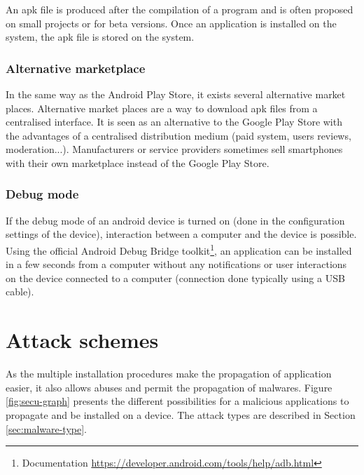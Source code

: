An apk file is produced after the compilation of a program and is often proposed on small projects or for beta versions.
Once an application is installed on the system, the apk file is stored on the system.

\subsubsection{Alternative marketplace}
In the same way as the Android Play Store, it exists several alternative market places.
Alternative market places are a way to download apk files from a centralised interface.
It is seen as an alternative to the Google Play Store with the advantages of a centralised distribution medium (paid system, users reviews, moderation...).
Manufacturers or service providers sometimes sell smartphones with their own marketplace instead of the Google Play Store.\\


\subsubsection{Debug mode}
If the debug mode of an android device is turned on (done in the configuration settings of the device), interaction between a computer and the device is possible.
Using the official Android Debug Bridge toolkit\footnote{Documentation \url{https://developer.android.com/tools/help/adb.html}}, an application can be installed in a few seconds from a computer without any notifications or user interactions on the device connected to a computer (connection done typically using a USB cable).

\section{Attack schemes}

As the multiple installation procedures make the propagation of application easier, it also allows abuses and permit the propagation of malwares.
Figure \ref{fig:secu-graph} presents the different possibilities for a malicious applications to propagate and be installed on a device.
The attack types are described in Section \ref{sec:malware-type}.

